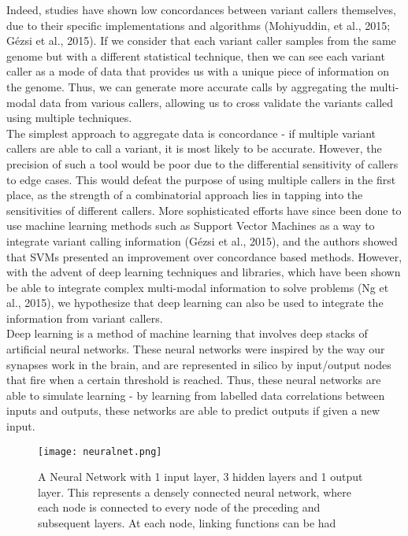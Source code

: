 \documentclass{article}
\begin{document}
Indeed, studies have shown low concordances between variant callers themselves, due to their specific implementations and algorithms (Mohiyuddin, et al., 2015; Gézsi et al., 2015). If we consider that each variant caller samples from the same genome but with a different statistical technique, then we can see each variant caller as a mode of data that provides us with a unique piece of information on the genome. Thus, we can generate more accurate calls by aggregating the multi-modal data from various callers, allowing us to cross validate the variants called using multiple techniques.\\

The simplest approach to aggregate data is concordance - if multiple variant callers are able to call a variant, it is most likely to be accurate. However, the precision of such a tool would be poor due to the differential sensitivity of callers to edge cases. This would defeat the purpose of using multiple callers in the first place, as the strength of a combinatorial approach lies in tapping into the sensitivities of different callers. More sophisticated efforts have since been done to use machine learning methods such as Support Vector Machines as a way to integrate variant calling information (Gézsi et al., 2015), and the authors showed that SVMs presented an improvement over concordance based methods. However, with the advent of deep learning techniques and libraries, which have been shown be able to integrate complex multi-modal information to solve problems (Ng et al., 2015), we hypothesize that deep learning can also be used to integrate the information from variant callers.\\

Deep learning is a method of machine learning that involves deep stacks of artificial neural networks. These neural networks were inspired by the way our synapses work in the brain, and are represented in silico by input/output nodes that fire when a certain threshold is reached. Thus, these neural networks are able to simulate learning - by learning from labelled data correlations between inputs and outputs, these networks are able to predict outputs if given a new input. 

\begin{figure}[h]
\texttt{[image: neuralnet.png]}
\centering
\caption{A Neural Network with 1 input layer, 3 hidden layers and 1 output layer. This represents a densely connected neural network, where each node is connected to every node of the preceding and subsequent layers. At each node, linking functions can be had }
\end{figure}
\end{document}
